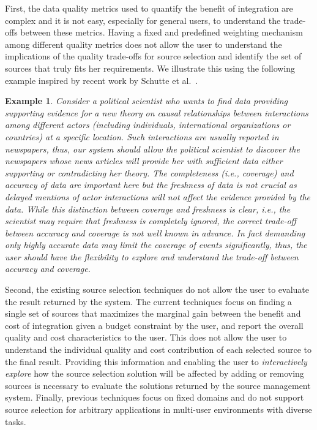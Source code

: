 \documentclass{sig-alternate}
\newtheorem{example}{Example}
\begin{document}
First, the data quality metrics used to quantify the benefit of integration are complex and it is not easy, especially for general users, to understand the trade-offs between these metrics. Having a fixed and predefined weighting mechanism among different quality metrics does not allow the user to understand the implications of the quality trade-offs for source selection and identify the set of sources that truly fits her requirements. We illustrate this using the following example inspired by recent work by Schutte et al.~\cite{schutte:2014}.
\vspace{-5pt}
\begin{example}
Consider a political scientist who wants to find data providing supporting evidence for a new theory on causal relationships between interactions among different actors (including individuals, international organizations or countries) at a specific location. Such interactions are usually reported in newspapers, thus, our system should allow the political scientist to discover the newspapers whose news articles will provide her with sufficient data either supporting or contradicting her theory. The completeness (i.e., coverage) and accuracy of data are important here but the freshness of data is not crucial as delayed mentions of actor interactions will not affect the evidence provided by the data. While this distinction between coverage and freshness is clear, i.e., the scientist may require that freshness is completely ignored, the correct trade-off between accuracy and coverage is not well known in advance. In fact demanding only highly accurate data may limit the coverage of events significantly, thus, the user should have the flexibility to explore and understand the trade-off between accuracy and coverage. 
\end{example}
Second, the existing source selection techniques do not allow the user to evaluate the result returned by the system. The current techniques focus on finding a single set of sources that maximizes the marginal gain between the benefit and cost of integration given a budget constraint by the user, and report the overall quality and cost characteristics to the user. This does not allow the user to understand the individual quality and cost contribution of each selected source to the final result. Providing this information and enabling the user to {\em interactively explore} how the source selection solution will be affected by adding or removing sources is necessary to evaluate the solutions returned by the source management system. Finally, previous techniques focus on fixed domains and do not support source selection for arbitrary applications in multi-user environments with diverse tasks.  
\end{document}
